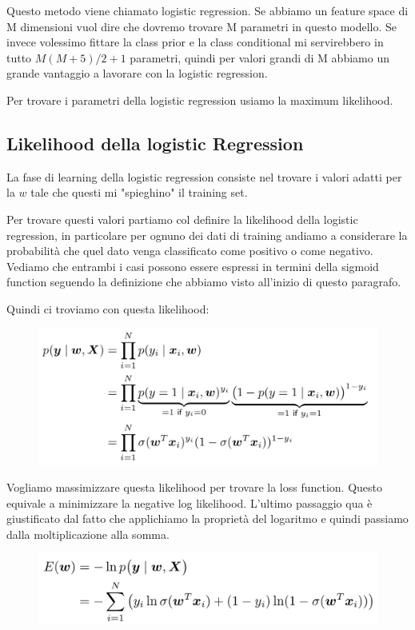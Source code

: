 \documentclass[14pt]{extreport}
\begin{document}
Questo metodo viene chiamato logistic regression. Se abbiamo un feature space di M dimensioni vuol dire che dovremo trovare M parametri in questo
modello. Se invece volessimo fittare la class prior e la class conditional mi servirebbero in tutto $M(M+5)/2+1$ parametri, quindi per valori grandi
di M abbiamo un grande vantaggio a lavorare con la logistic regression.

Per trovare i parametri della logistic regression usiamo la maximum likelihood.


\subsection{Likelihood della logistic Regression}

La fase di learning della logistic regression consiste nel trovare i valori adatti per la $w$ tale che questi mi "spieghino" il training set.

Per trovare questi valori partiamo col definire la likelihood della logistic regression, in particolare per ognuno dei dati di training andiamo a
considerare la probabilità che quel dato venga classificato come positivo o come negativo. Vediamo che entrambi i casi possono essere espressi in
termini della sigmoid function seguendo la definizione che abbiamo visto all'inizio di questo paragrafo.

Quindi ci troviamo con questa likelihood:

\begin{figure}[H]
	\centering
	\includegraphics[width=0.7\linewidth]{191.jpeg}
\end{figure}

Vogliamo massimizzare questa likelihood per trovare la loss function. Questo equivale a minimizzare la negative log likelihood. L'ultimo passaggio qua
è giustificato dal fatto che applichiamo la proprietà del logaritmo e quindi passiamo dalla moltiplicazione alla somma.

\begin{figure}[H]
	\centering
	\includegraphics[width=0.7\linewidth]{192.jpeg}
\end{figure}
\end{document}
